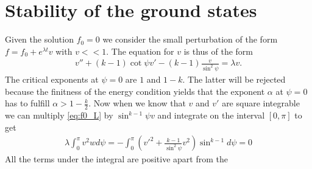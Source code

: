 \section*{Stability of the ground states}

Given the solution $f_0=0$ we consider the small perturbation of the
form $f=f_0+e^{\lambda t} v$ with $v<<1$. The equation for $v$ is thus
of the form
\begin{align}\label{eq:f0_L}
  v''+(k-1)\cot\psi v'-(k-1)\frac{v}{\sin^2\psi}=\lambda v.
\end{align}
The critical exponents at $\psi=0$ are $1$ and $1-k$. The latter will
be rejected because the finitness of the energy condition yields that
the exponent $\alpha$ at $\psi=0$ has to fulfill
$\alpha>1-\frac{k}{2}$. Now when we know that $v$ and $v'$ are square
integrable we can multiply \eqref{eq:f0_L} by $\sin^{k-1}\psi v$ and
integrate on the interval $[0,\pi]$ to get
\begin{align}
  \lambda\int_0^\pi v^2w d\psi=-\int_0^\pi\left(v'^2+\frac{k-1}{\sin^2\psi}v^2\right)\sin^{k-1}d\psi=0
\end{align}
All the terms under the integral are positive apart from the


